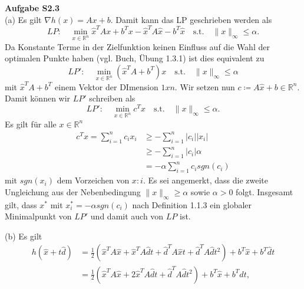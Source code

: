 \documentclass[ngerman, a4paper,12pt]{article}
\begin{document}
\par

\textbf{Aufgabe S2.3} \\

(a) Es gilt $\nabla h(x) = Ax + b$. Damit kann das LP geschrieben werden als
\begin{equation*}
	LP: \quad \min_{x \in \mathbb{R}^n} \hat{x}^T Ax + b^Tx - \hat{x}^TA \hat{x} - b^T \hat{x} \quad \text{s.t.} \quad \| x \|_{\infty} \leq \alpha.
\end{equation*}
Da Konstante Terme in der Zielfunktion keinen Einfluss auf die Wahl der optimalen Punkte haben (vgl. Buch, Übung 1.3.1) ist dies equivalent zu
\begin{equation*}
	LP': \quad \min_{x \in \mathbb{R}^n} \left( \hat{x}^T A + b^T \right) x\quad \text{s.t.} \quad \| x \|_{\infty} \leq \alpha
\end{equation*}
mit $\hat{x}^T A + b^T$ einem Vektor der DImension $1xn$. Wir setzen nun $c \coloneqq A \hat{x} + b \in \mathbb{R}^n$. Damit können wir $LP'$ schreiben als
\begin{equation*}
LP': \quad \min_{x \in \mathbb{R}^n} c^T x\quad \text{s.t.} \quad \| x \|_{\infty} \leq \alpha.
\end{equation*}
Es gilt für alle $x \in \mathbb{R}^n$
\begin{equation*}
	\begin{split}
		c^Tx = \sum_{i=1}^{n} c_ix_i &\geq - \sum_{i=1}^{n} |c_i| |x_i| \\
		&\geq -\sum_{i=1}^{n} |c_i| \alpha \\
		&= -\alpha \sum_{i=1}^{n} c_i sgn(c_i) 
	\end{split}
\end{equation*}
mit $sgn(x_i)$ dem Vorzeichen von $x:i$. Es sei angemerkt, dass die zweite Ungleichung aus der Nebenbedingung $\| x \|_{\infty} \geq \alpha$ sowie $\alpha > 0$ folgt. Insgesamt gilt, dass $x^*$ mit $x^*_i = - \alpha sgn(c_i)$ nach Definition 1.1.3 ein globaler Minimalpunkt von $LP'$ und damit auch von $LP$ ist.
\par
(b) Es gilt 
\begin{equation*}
	\begin{split}
		h(\hat{x} + t\hat{d}) &= \frac{1}{2} \left( \hat{x}^TA\hat{x} +\hat{x}^TA\hat{d}t + \hat{d}^TA\hat{x}t + \hat{d}^TA\hat{d}t^2 \right) + b^T\hat{x} + b^T\hat{d}t\\
		&= \frac{1}{2} \left( \hat{x}^TA\hat{x} +2 \hat{x}^TA\hat{d}t + \hat{d}^TA\hat{d}t^2 \right) + b^T\hat{x} + b^T\hat{d}t,
	\end{split}
\end{equation*}
\end{document}
